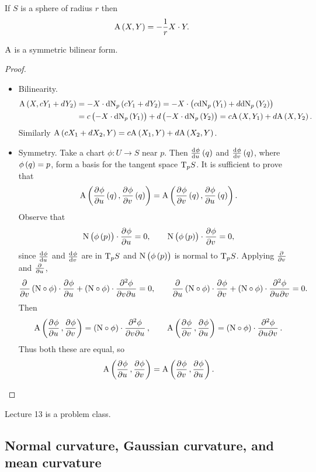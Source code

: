 \begin{example*}
If $ S $ is a sphere of radius $ r $ then
$$ \A\br{X, Y} = -\dfrac{1}{r}X \cdot Y. $$
\end{example*}

\begin{proposition}
$ \mathrm{A} $ is a symmetric bilinear form.
\end{proposition}

\begin{proof}
\hfill
\begin{itemize}
\item Bilinearity.
\begin{align*}
\A\br{X, cY_1 + dY_2}
& = -X \cdot \d\N_p\br{cY_1 + dY_2}
= -X \cdot \br{c\d\N_p\br{Y_1} + d\d\N_p\br{Y_2}} \\
& = c\br{-X \cdot \d\N_p\br{Y_1}} + d\br{-X \cdot \d\N_p\br{Y_2}}
= c\A\br{X, Y_1} + d\A\br{X, Y_2}.
\end{align*}
Similarly $ \A\br{cX_1 + dX_2, Y} = c\A\br{X_1, Y} + d\A\br{X_2, Y} $.
\item Symmetry. Take a chart $ \phi : U \to S $ near $ p $. Then $ \tod{\phi}{u}\br{q} $ and $ \tod{\phi}{v}\br{q} $, where $ \phi\br{q} = p $, form a basis for the tangent space $ \mathrm{T}_p S $. It is sufficient to prove that
$$ \A\br{\dpd{\phi}{u}\br{q}, \dpd{\phi}{v}\br{q}} = \A\br{\dpd{\phi}{v}\br{q}, \dpd{\phi}{u}\br{q}}. $$
Observe that
$$ \N\br{\phi\br{p}} \cdot \dpd{\phi}{u} = 0, \qquad \N\br{\phi\br{p}} \cdot \dpd{\phi}{v} = 0, $$
since $ \tod{\phi}{u} $ and $ \tod{\phi}{v} $ are in $ \mathrm{T}_p S $ and $ \N\br{\phi\br{p}} $ is normal to $ \mathrm{T}_p S $. Applying $ \tpd{}{v} $ and $ \tpd{}{u} $,
$$ \dpd{}{v}\br{\N \circ \phi} \cdot \dpd{\phi}{u} + \br{\N \circ \phi} \cdot \dmd{\phi}{2}{v}{}{u}{} = 0, \qquad \dpd{}{u}\br{\N \circ \phi} \cdot \dpd{\phi}{v} + \br{\N \circ \phi} \cdot \dmd{\phi}{2}{u}{}{v}{} = 0. $$
Then
$$ \A\br{\dpd{\phi}{u}, \dpd{\phi}{v}} = \br{\N \circ \phi} \cdot \dmd{\phi}{2}{v}{}{u}{}, \qquad \A\br{\dpd{\phi}{v}, \dpd{\phi}{u}} = \br{\N \circ \phi} \cdot \dmd{\phi}{2}{u}{}{v}{}. $$
Thus both these are equal, so
$$ \A\br{\dpd{\phi}{u}, \dpd{\phi}{v}} = \A\br{\dpd{\phi}{v}, \dpd{\phi}{u}}. $$
\end{itemize}
\end{proof}


Lecture 13 is a problem class.

\pagebreak

\subsection{Normal curvature, Gaussian curvature, and mean curvature}

